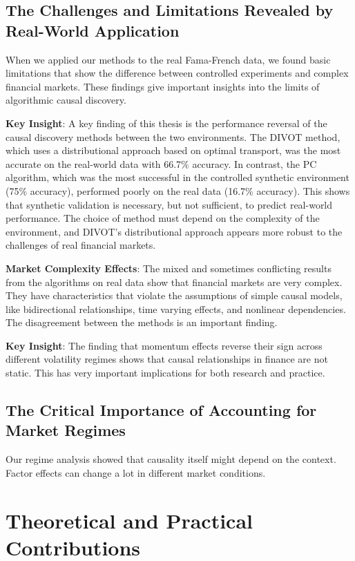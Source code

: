 \subsection{The Challenges and Limitations Revealed by Real-World Application}

When we applied our methods to the real Fama-French data, we found basic limitations that show the difference between controlled experiments and complex financial markets. These findings give important insights into the limits of algorithmic causal discovery.

\textbf{Key Insight}: A key finding of this thesis is the performance reversal of the causal discovery methods between the two environments. The DIVOT method, which uses a distributional approach based on optimal transport, was the most accurate on the real-world data with 66.7\% accuracy. In contrast, the PC algorithm, which was the most successful in the controlled synthetic environment (75\% accuracy), performed poorly on the real data (16.7\% accuracy). This shows that synthetic validation is necessary, but not sufficient, to predict real-world performance. The choice of method must depend on the complexity of the environment, and DIVOT's distributional approach appears more robust to the challenges of real financial markets.

\textbf{Market Complexity Effects}: The mixed and sometimes conflicting results from the algorithms on real data show that financial markets are very complex. They have characteristics that violate the assumptions of simple causal models, like bidirectional relationships, time varying effects, and nonlinear dependencies. The disagreement between the methods is an important finding.

\textbf{Key Insight}: The finding that momentum effects reverse their sign across different volatility regimes shows that causal relationships in finance are not static. This has very important implications for both research and practice.

\subsection{The Critical Importance of Accounting for Market Regimes}

Our regime analysis showed that causality itself might depend on the context. Factor effects can change a lot in different market conditions.

\section{Theoretical and Practical Contributions}

